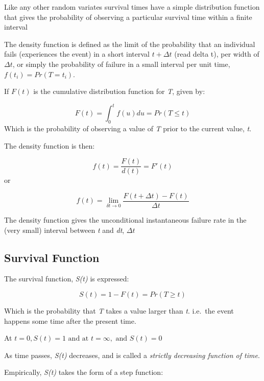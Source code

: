 \documentclass[
  letterpaper,
  DIV=11,
  numbers=noendperiod]{scrreprt}
\newenvironment{Shaded}{\begin{snugshade}}{\end{snugshade}}
\newcommand{\AttributeTok}[1]{\textcolor[rgb]{0.40,0.45,0.13}{#1}}
\newcommand{\DecValTok}[1]{\textcolor[rgb]{0.68,0.00,0.00}{#1}}
\newcommand{\FunctionTok}[1]{\textcolor[rgb]{0.28,0.35,0.67}{#1}}
\newcommand{\NormalTok}[1]{\textcolor[rgb]{0.00,0.23,0.31}{#1}}
\newcommand{\OtherTok}[1]{\textcolor[rgb]{0.00,0.23,0.31}{#1}}
\newcommand{\SpecialCharTok}[1]{\textcolor[rgb]{0.37,0.37,0.37}{#1}}
\newcommand{\StringTok}[1]{\textcolor[rgb]{0.13,0.47,0.30}{#1}}
\begin{document}
Like any other random variates survival times have a simple distribution
function that gives the probability of observing a particular survival
time within a finite interval

The density function is defined as the limit of the probability that an
individual fails (experiences the event) in a short interval
\(t+\Delta t\) (read delta t), per width of \(\Delta t\), or simply the
probability of failure in a small interval per unit time,
\(f(t_i) = Pr(T=t_i)\).

If \(F(t)\) is the cumulative distribution function for \emph{T}, given
by:

\[ F(t) = \int_{0}^{t} f(u) du = Pr(T \leqslant t )\] Which is the
probability of observing a value of \emph{T} prior to the current value,
\emph{t}.

The density function is then:

\[ f(t) = \frac{F(t)}{d(t)} = F'(t)\] or

\[ f(t) = \lim_{\delta t \rightarrow 0} \frac{F(t+\Delta t) - F(t)}{\Delta t}\]

The density function gives the unconditional instantaneous failure rate
in the (very small) interval between \emph{t} and \emph{dt},
\(\Delta t\)

\hypertarget{survival-function}{%
\subsection{Survival Function}\label{survival-function}}

The survival function, \emph{S(t)} is expressed:

\[ S(t) = 1 - F(t) = Pr (T \geqslant t)\]

Which is the probability that \emph{T} takes a value larger than
\emph{t}. i.e.~the event happens some time after the present time.

At \(t = 0, S(t) =1 \text { and at } t= \infty, \text { and } S(t) =0\)

As time passes, \emph{S(t)} decreases, and is called a \emph{strictly
decreasing function of time}.

Empirically, \emph{S(t)} takes the form of a step function:

\begin{Shaded}
\end{Shaded}
\end{document}
